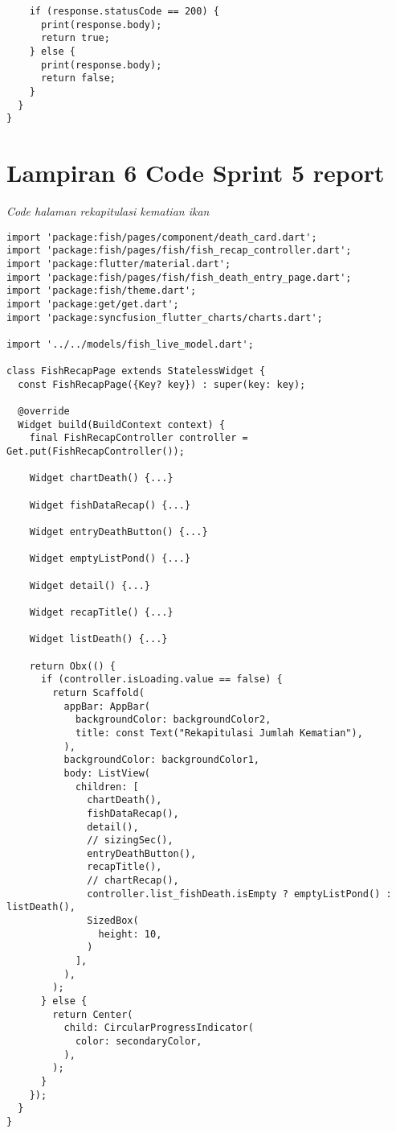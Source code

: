 \begin{lstlisting}
    if (response.statusCode == 200) {
      print(response.body);
      return true;
    } else {
      print(response.body);
      return false;
    }
  }
}
	\end{lstlisting}


	\clearpage
	\section{Lampiran 6 Code Sprint 5 report}
	\textit{Code halaman rekapitulasi kematian ikan}
	\begin{lstlisting}
import 'package:fish/pages/component/death_card.dart';
import 'package:fish/pages/fish/fish_recap_controller.dart';
import 'package:flutter/material.dart';
import 'package:fish/pages/fish/fish_death_entry_page.dart';
import 'package:fish/theme.dart';
import 'package:get/get.dart';
import 'package:syncfusion_flutter_charts/charts.dart';

import '../../models/fish_live_model.dart';

class FishRecapPage extends StatelessWidget {
  const FishRecapPage({Key? key}) : super(key: key);

  @override
  Widget build(BuildContext context) {
    final FishRecapController controller = Get.put(FishRecapController());

    Widget chartDeath() {...}

    Widget fishDataRecap() {...}

    Widget entryDeathButton() {...}

    Widget emptyListPond() {...}

    Widget detail() {...}

    Widget recapTitle() {...}

    Widget listDeath() {...}

    return Obx(() {
      if (controller.isLoading.value == false) {
        return Scaffold(
          appBar: AppBar(
            backgroundColor: backgroundColor2,
            title: const Text("Rekapitulasi Jumlah Kematian"),
          ),
          backgroundColor: backgroundColor1,
          body: ListView(
            children: [
              chartDeath(),
              fishDataRecap(),
              detail(),
              // sizingSec(),
              entryDeathButton(),
              recapTitle(),
              // chartRecap(),
              controller.list_fishDeath.isEmpty ? emptyListPond() : listDeath(),
              SizedBox(
                height: 10,
              )
            ],
          ),
        );
      } else {
        return Center(
          child: CircularProgressIndicator(
            color: secondaryColor,
          ),
        );
      }
    });
  }
}
	\end{lstlisting}


